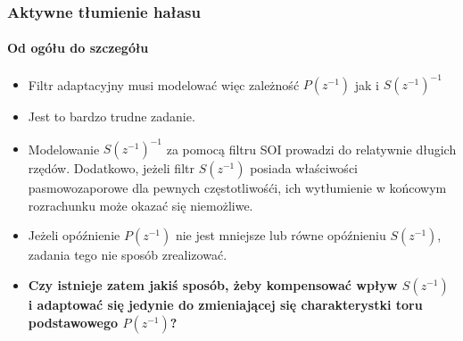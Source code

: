 \documentclass{beamer}
\begin{document}
        \begin{frame}
            \frametitle{Aktywne tłumienie hałasu}
            \framesubtitle{Od ogółu do szczegółu}
                \begin{itemize}
                    \item Filtr adaptacyjny musi modelować więc zależność $P(z^{-1})$ jak i $S(z^{-1})^{-1}$
                    \item Jest to bardzo trudne zadanie.
                    \item Modelowanie $S(z^{-1})^{-1}$ za pomocą filtru SOI prowadzi do relatywnie długich rzędów. Dodatkowo, jeżeli filtr $S(z^{-1})$ posiada właściwości pasmowozaporowe 
                    dla pewnych częstotliwośći, ich wytłumienie w końcowym rozrachunku może okazać się niemożliwe.
                    \item Jeżeli opóźnienie $P(z^{-1})$ nie jest mniejsze lub równe opóźnieniu $S(z^{-1})$, zadania tego nie sposób zrealizować.
                    \item \textbf{Czy istnieje zatem jakiś sposób, żeby kompensować wpływ $S(z^{-1})$ i adaptować się jedynie do zmieniającej się charakterystki toru podstawowego $P(z^{-1})$?}
            \end{itemize}
        \end{frame} 
\end{document}

